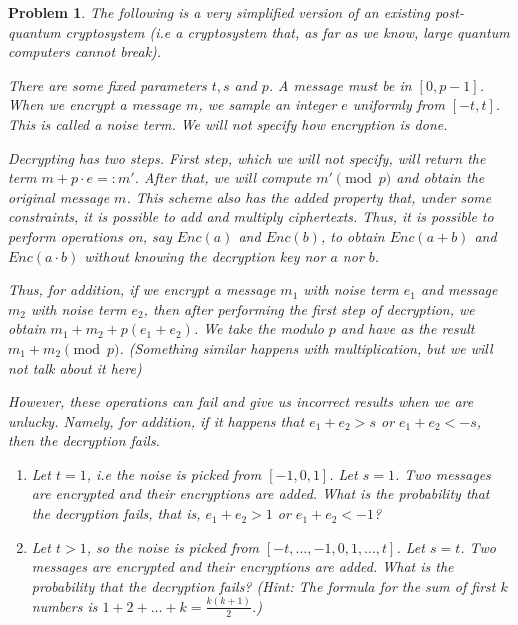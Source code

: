 \documentclass{../homework}
\newtheorem{problem}{Problem}
\begin{document}
\begin{problem}
    The following is a very simplified version of an existing post-quantum
    cryptosystem (i.e a cryptosystem that, as far as we know, large quantum
    computers cannot break).
    
    There are some fixed parameters $t, s$ and $p$. A message must be in
    $[0, p - 1]$. When we encrypt a message $m$, we sample an integer $e$
    uniformly from $[-t, t]$. This is called a noise term. We will not specify
    how encryption is done.
    
    Decrypting has two steps. First step, which we will not specify, will
    return the term $m + p\cdot e =: m'$. After that, we will compute
    $m'\pmod{p}$ and obtain the original message $m$. This scheme also has the
    added property that, under some constraints, it is possible to add and
    multiply ciphertexts. Thus, it is possible to perform operations on, say
    $Enc(a)$ and $Enc(b)$, to obtain $Enc(a + b)$ and $Enc(a\cdot b)$ without
    knowing the decryption key nor $a$ nor $b$.
    
    Thus, for addition, if we encrypt a message $m_1$ with noise term $e_1$ and
    message $m_2$ with noise term $e_2$, then after performing the first step of
    decryption, we obtain $m_1 + m_2 + p(e_1 + e_2)$. We take the modulo $p$ and
    have as the result $m_1 + m_2 \pmod{p}$. (Something similar happens with
    multiplication, but we will not talk about it here)
    
    However, these operations can fail and give us incorrect results when we are
    unlucky. Namely, for addition, if it happens that
    $e_1 + e_2 > s$ or $e_1 + e_2 < -s$, then the decryption fails.
    \begin{enumerate}[label=(\alph*)]
        \item Let $t = 1$, i.e the noise is picked from $[-1, 0, 1]$. Let
        $s = 1$. Two messages are encrypted and their encryptions are added.
        What is the probability that the decryption fails, that is,
        $e_1 + e_2 > 1$ or $e_1 + e_2 < -1$?
        \item Let $t > 1$, so the noise is picked from
        $[-t,\dots, -1, 0, 1,\dots, t]$. Let $s = t$. Two messages are encrypted
        and their encryptions are added. What is the probability that the
        decryption fails? (Hint: The formula for the sum of first $k$ numbers is
        $1 + 2 +\dots+ k = \frac{k(k+1)}{2}$.)
    \end{enumerate}
\end{problem}
\end{document}

